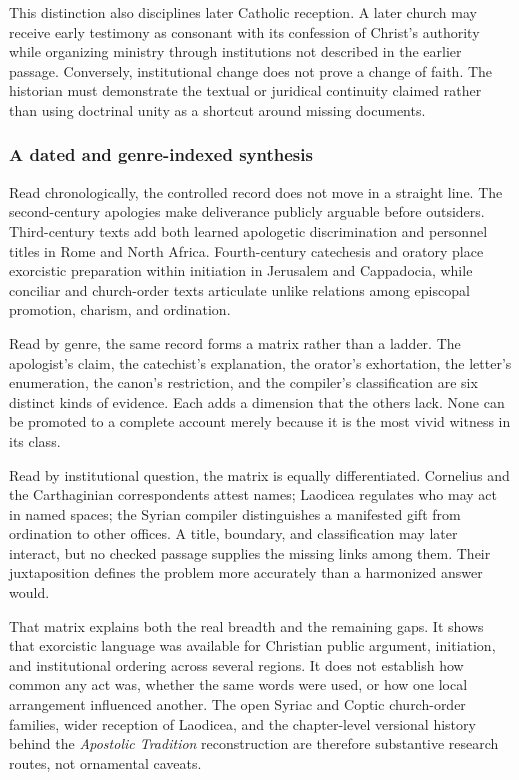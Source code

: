 This distinction also disciplines later Catholic reception. A later church
may receive early testimony as consonant with its confession of Christ's
authority while organizing ministry through institutions not described in the
earlier passage. Conversely, institutional change does not prove a change of
faith. The historian must demonstrate the textual or juridical continuity
claimed rather than using doctrinal unity as a shortcut around missing
documents.

\subsubsection{A dated and genre-indexed synthesis}

Read chronologically, the controlled record does not move in a straight line.
The second-century apologies make deliverance publicly arguable before
outsiders. Third-century texts add both learned apologetic discrimination and
personnel titles in Rome and North Africa. Fourth-century catechesis and
oratory place exorcistic preparation within initiation in Jerusalem and
Cappadocia, while conciliar and church-order texts articulate unlike
relations among episcopal promotion, charism, and ordination.

Read by genre, the same record forms a matrix rather than a ladder. The
apologist's claim, the catechist's explanation, the orator's exhortation, the
letter's enumeration, the canon's restriction, and the compiler's
classification are six distinct kinds of evidence. Each adds a dimension that
the others lack. None can be promoted to a complete account merely because it
is the most vivid witness in its class.

Read by institutional question, the matrix is equally differentiated.
Cornelius and the Carthaginian correspondents attest names; Laodicea regulates
who may act in named spaces; the Syrian compiler distinguishes a manifested
gift from ordination to other offices. A title, boundary, and classification
may later interact, but no checked passage supplies the missing links among
them. Their juxtaposition defines the problem more accurately than a
harmonized answer would.

That matrix explains both the real breadth and the remaining gaps. It shows
that exorcistic language was available for Christian public argument,
initiation, and institutional ordering across several regions. It does not
establish how common any act was, whether the same words were used, or how one
local arrangement influenced another. The open Syriac and Coptic
church-order families, wider reception of Laodicea, and the chapter-level
versional history behind the \emph{Apostolic Tradition} reconstruction are
therefore substantive research routes, not ornamental caveats.


